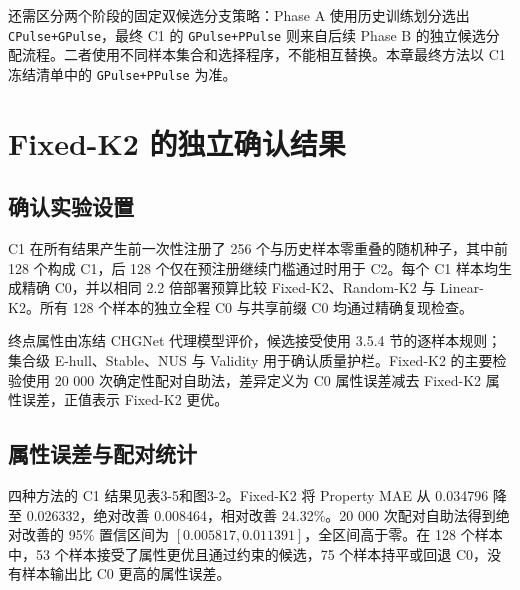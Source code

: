 还需区分两个阶段的固定双候选分支策略：Phase A 使用历史训练划分选出 \texttt{CPulse+GPulse}，最终 C1 的 \texttt{GPulse+PPulse} 则来自后续 Phase B 的独立候选分配流程。二者使用不同样本集合和选择程序，不能相互替换。本章最终方法以 C1 冻结清单中的 \texttt{GPulse+PPulse} 为准。

\section{Fixed-K2 的独立确认结果}

\subsection{确认实验设置}

C1 在所有结果产生前一次性注册了 256 个与历史样本零重叠的随机种子，其中前 128 个构成 C1，后 128 个仅在预注册继续门槛通过时用于 C2。每个 C1 样本均生成精确 C0，并以相同 2.2 倍部署预算比较 Fixed-K2、Random-\allowbreak K2 与 Linear-K2。所有 128 个样本的独立全程 C0 与共享前缀 C0 均通过精确复现检查。

终点属性由冻结 CHGNet 代理模型评价，候选接受使用 3.5.4 节的逐样本规则；集合级 E-hull、Stable、NUS 与 Validity 用于确认质量护栏。Fixed-K2 的主要检验使用 20 000 次确定性配对自助法，差异定义为 C0 属性误差减去 Fixed-K2 属性误差，正值表示 Fixed-K2 更优。

\subsection{属性误差与配对统计}

四种方法的 C1 结果见表3-5和图3-2。Fixed-K2 将 Property MAE 从 0.034796 降至 0.026332，绝对改善 0.008464，相对改善 24.32\%。20 000 次配对自助法得到绝对改善的 95\% 置信区间为 \([0.005817,0.011391]\)，全区间高于零。在 128 个样本中，53 个样本接受了属性更优且通过约束的候选，75 个样本持平或回退 C0，没有样本输出比 C0 更高的属性误差。


